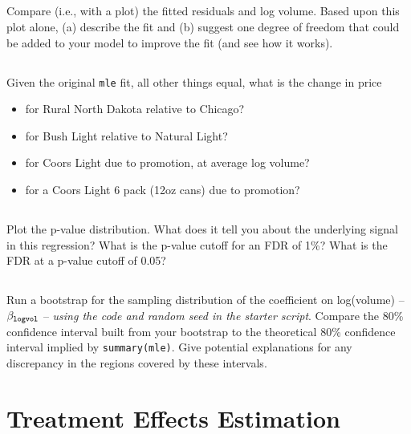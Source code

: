 \documentclass[12pt]{article}
\begin{document}
\subsection{} Compare (i.e., with a plot) the fitted residuals and log volume.  Based upon this plot alone, (a) describe the fit and (b) suggest one degree of freedom that could be added to your model to improve the fit (and see how it works).


\subsection{} 
Given the original \texttt{mle} fit, all other things equal, what is the change in price
\begin{itemize}
\item for Rural North Dakota relative to Chicago?
\item for Bush Light relative to Natural Light?
\item for Coors Light due to promotion, at average log volume?
\item for a Coors Light 6 pack (12oz cans) due to promotion?
\end{itemize}


\subsection{} Plot the p-value distribution.  What does it tell you about the underlying signal in this regression?  What is the p-value cutoff for an FDR of 1\%?  What is the FDR at a p-value cutoff of 0.05?

\subsection{} Run a bootstrap for the sampling distribution of the coefficient on log(volume) -- $\beta_{\tt logvol}$  -- \textit{using the code and random seed in the starter script}.  
Compare the 80\% confidence interval built from your bootstrap to the theoretical 80\% confidence interval implied by {\tt summary(mle)}.  Give potential explanations for any discrepancy in the regions covered by these intervals.

 
\newpage
\section{Treatment Effects Estimation}
\end{document}

